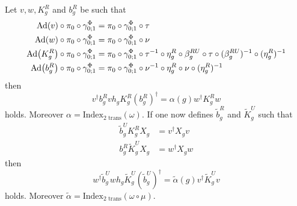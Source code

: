\documentclass[12pt,a4paper,twoside]{article}
\numberwithin{equation}{section}
\begin{document}
\begin{lemma}
	Let $v,w,K_g^R$ and $b_g^R$ be such that
	\begin{align}
		\Ad{v}\circ\pi_0\circ\gamma^\Phi_{0;1}&=\pi_0\circ\gamma^\Phi_{0;1}\circ\tau\\
		\Ad{w}\circ\pi_0\circ\gamma^\Phi_{0;1}&=\pi_0\circ\gamma^\Phi_{0;1}\circ\nu\\
		\Ad{K_g^R}\circ\pi_0\circ\gamma^\Phi_{0;1}&=\pi_0\circ\gamma^\Phi_{0;1}\circ\tau^{-1}\circ\eta_g^R\circ\beta_g^{RU}\circ\tau\circ(\beta_g^{RU})^{-1}\circ(\eta_g^R)^{-1}\\
		\Ad{b_g^R}\circ\pi_0\circ\gamma^\Phi_{0;1}&=\pi_0\circ\gamma^\Phi_{0;1}\circ\nu^{-1}\circ\eta_g^R\circ\nu\circ(\eta_g^R)^{-1}
	\end{align}
	then
	\begin{equation}\label{eq:H^1IndexRotationInvariantHorizontalIndex}
		v^\dagger b_g^R vh_g K_g^R (b_g^R)^\dagger=\alpha(g)w^\dagger K_g^R w
	\end{equation}
	holds. Moreover $\alpha=\textrm{Index}_{\text{2 trans}}(\omega)$. If one now defines $\tilde{b}_g^R$ and $\tilde{K}_g^U$ such that
	\begin{align}
		\label{eq:H^1IndexRotationInvariantFirstDefinition}
		\tilde{b}_g^UK_g^R X_g&=v^\dagger X_g v\\
		\label{eq:H^1IndexRotationInvariantSecondDefinition}
		b_g^R\tilde{K}_g^UX_g&=w^\dagger X_g w
	\end{align}
	then
	\begin{equation}\label{eq:H^1IndexRotationInvariantVerticalIndex}
		w^\dagger \tilde b_g^U wh_g \tilde K_g^U (\tilde b_g^U)^\dagger=\tilde\alpha(g)v^\dagger \tilde K_g^U v
	\end{equation}
	holds. Moreover $\tilde\alpha=\textrm{Index}_{\text{2 trans}}(\omega\circ\mu)$.
\end{lemma}
\end{document}
